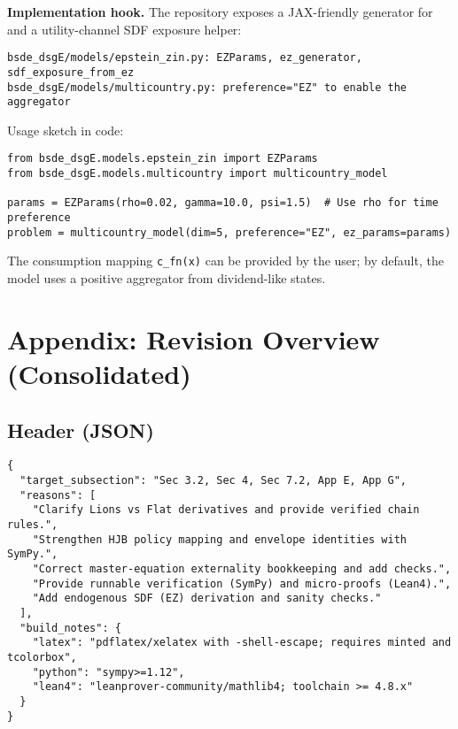 ﻿\documentclass[11pt,letterpaper,oneside]{article}
\numberwithin{equation}{section}
\newcommand{\1}{\mathbf{1}}
\begin{document}
\begin{tcolorbox}[didacticstyle]
\begin{itemize}[leftmargin=1.1em,itemsep=0.25em]
\begin{tcolorbox}[didacticstyle]
\textbf{Implementation hook.} The repository exposes a JAX-friendly generator
for  and a utility-channel SDF exposure helper:
\begin{verbatim}
bsde_dsgE/models/epstein_zin.py: EZParams, ez_generator, sdf_exposure_from_ez
bsde_dsgE/models/multicountry.py: preference="EZ" to enable the aggregator
\end{verbatim}
Usage sketch in code:
\begin{verbatim}
from bsde_dsgE.models.epstein_zin import EZParams
from bsde_dsgE.models.multicountry import multicountry_model

params = EZParams(rho=0.02, gamma=10.0, psi=1.5)  # Use rho for time preference
problem = multicountry_model(dim=5, preference="EZ", ez_params=params)
\end{verbatim}
The consumption mapping \verb|c_fn(x)| can be provided by the user; by default,
the model uses a positive aggregator from dividend-like states.
\end{tcolorbox}

\section*{Appendix: Revision Overview (Consolidated)}

\subsection*{Header (JSON)}
\begin{tcolorbox}[sympycheckstyle,title={Editorial Header (JSON)}]
\begin{Verbatim}[fontsize=\small]
{
  "target_subsection": "Sec 3.2, Sec 4, Sec 7.2, App E, App G",
  "reasons": [
    "Clarify Lions vs Flat derivatives and provide verified chain rules.",
    "Strengthen HJB policy mapping and envelope identities with SymPy.",
    "Correct master-equation externality bookkeeping and add checks.",
    "Provide runnable verification (SymPy) and micro-proofs (Lean4).",
    "Add endogenous SDF (EZ) derivation and sanity checks."
  ],
  "build_notes": {
    "latex": "pdflatex/xelatex with -shell-escape; requires minted and tcolorbox",
    "python": "sympy>=1.12",
    "lean4": "leanprover-community/mathlib4; toolchain >= 4.8.x"
  }
}
\end{Verbatim}
\end{tcolorbox}


\end{itemize}
\end{tcolorbox}
\end{document}
